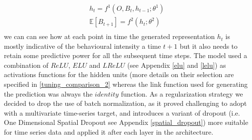 \begin{gather}
\label{rnn_1_exp}
   h_t = f^1(O, B_{t}, h_{t-1}; \theta^1)  \\ \nonumber
   \mathbb{E}[B_{t+1}] = f^2(h_t; \theta^2) \\ \nonumber    
\end{gather}
we can can see how at each point in time the generated representation $h_t$ is mostly indicative of the behavioural intensity a time $t+1$ but it also needs to retain some predictive power for all the subsequent time steps. The model used a combination of $ReLU$, $ELU$ and $LReLU$ (see Appendix \ref{elu} and \ref{lelu}) as activations functions for the hidden units (more details on their selection are specified in \ref{tuning_comparison_2} whereas the link function used for generating the prediction was always the $identity$ function. As a regularization strategy we decided to drop the use of batch normalization, as it proved challenging to adopt with a multivariate time-series target, and introduces a variant of dropout (i.e. One Dimensional Spatial Dropout see Appendix \ref{spatial_dropout}) more suitable for time series data and applied it after each layer in the architecture.

